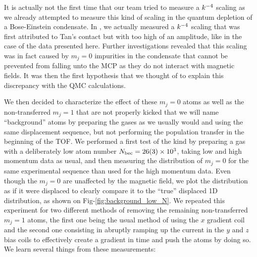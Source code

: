 It is actually not the first time that our team tried to measure a $k^{-4}$ scaling as we already attempted to measure this kind of scaling in the quantum depletion of a Bose-Einstein condensate. In \cite{chang2016momentum}, we actually measured a $k^{-4}$ scaling that was first attributed to Tan's contact but with too high of an amplitude, like in the case of the data presented here. Further investigations \cite{cayla_these} revealed that this scaling was in fact caused by $m_j=0$ impurities in the condensate that cannot be prevented from falling unto the MCP as they do not interact with magnetic fields. It was then the first hypothesis that we thought of to explain this discrepancy with the QMC calculations.

We then decided to characterize the effect of these $m_j=0$ atoms as well as the non-transferred $m_j=1$ that are not properly kicked that we will name ``background'' atoms by preparing the gases as we usually would and using the same displacement sequence, but not performing the population transfer in the beginning of the TOF. We performed a first test of the kind by preparing a gas with a deliberately low atom number $N_{\rm{bec}}=26(3) \times 10^3$, taking low and high momentum data as usual, and then measuring the distribution of $m_j=0$ for the same experimental sequence than used for the high momentum data. Even though the $m_j=0$ are unaffected by the magnetic field, we plot the distribution as if it were displaced to clearly compare it to the ``true'' displaced 1D distribution, as shown on Fig-\ref{fig:background_low_N}. We repeated this experiment for two different methods of removing the remaining non-transferred $m_j=1$ atoms, the first one being the usual method of using the $x$ gradient coil and the second one consisting in abruptly ramping up the current in the $y$ and $z$ bias coils to effectively create a gradient in time and push the atoms by doing so. We learn several things from these measurements:

